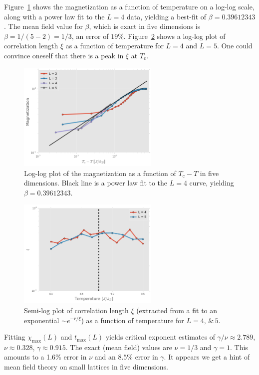 \documentclass[11pt, oneside]{article}
\begin{document}
Figure~\ref{fig:5D_mag_loglog} shows the magnetization as a function of temperature on a log-log scale, along with a power law fit to the $L=4$ data, yielding a best-fit of $\beta=0.39612343$. The mean field value for $\beta$, which is exact in five dimensions is $\beta=1/(5-2)=1/3$, an error of $19\%$. Figure~\ref{fig:5D_corr} shows a log-log plot of correlation length $\xi$ as a function of temperature for $L=4$ and $L=5$. One could convince oneself that there is a peak in $\xi$ at $T_\text{c}$.
\begin{figure}[H]
   \centering
   \includegraphics[width=0.6\textwidth]{img/5D/mag_loglog} %
   \caption{Log-log plot of the magnetization as a function of $T_\text{c}-T$ in five dimensions. Black line is a power law fit to the $L=4$ curve, yielding $\beta=0.39612343$.}
   \label{fig:5D_mag_loglog}
\end{figure}
\begin{figure}[H]
\centering
    \includegraphics[width=0.6\textwidth]{img/5D/xi_T}
\caption{Semi-log plot of correlation length $\xi$ (extracted from a fit to an exponential $\sim e^{-r/\xi}$) as a function of temperature for $L=4,\,\&\,5$.}
\label{fig:5D_corr}
\end{figure}
Fitting $\chi_\text{max}(L)$ and $t_\text{max}(L)$ yields critical exponent estimates of $\gamma/\nu\approx2.789$, $\nu\approx0.328$, $\gamma\approx0.915$. The exact (mean field) values are $\nu=1/3$ and $\gamma=1$. This amounts to a 1.6\% error in $\nu$ and an $8.5\%$ error in $\gamma$. It appears we get a hint of mean field theory on small lattices in five dimensions.
\end{document}
